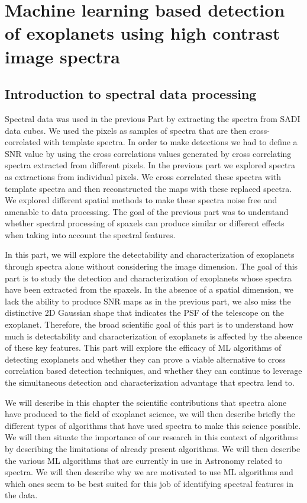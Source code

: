 \part{Machine learning based detection of exoplanets using high contrast image spectra}

\vfill
\startcontents[chapters]
\printmyminitoc{}
\chapter{Introduction to spectral data processing}\label{chap: III.1}
Spectral data was used in the previous Part by extracting the spectra from SADI data cubes.
We used the pixels as samples of spectra that are then cross-correlated with template spectra.
In order to make detections we had to define a SNR value by using the cross correlations values generated by cross correlating spectra extracted from different pixels.
In the previous part we explored spectra as extractions from individual pixels.
We cross correlated these spectra with template spectra and then reconstructed the maps with these replaced spectra.
We explored different spatial methods to make these spectra noise free and amenable to data processing.
The goal of the previous part was to understand whether spectral processing of spaxels can produce similar or different effects when taking into account the spectral features.

In this part, we will explore the detectability and characterization of exoplanets through spectra alone without considering the image dimension. 
The goal of this part is to study the detection and characterization of exoplanets whose spectra have been extracted from the spaxels.
In the absence of a spatial dimension, we lack the ability to produce SNR maps as in the previous part, we also miss the distinctive 2D Gaussian shape that indicates the PSF of the telescope on the exoplanet.
Therefore, the broad scientific goal of this part is to understand how much is detectability and characterization of exoplanets is affected by the absence of these key features.
This part will explore the efficacy of ML algorithms of detecting exoplanets and whether they can prove a viable alternative to cross correlation based detection techniques, and whether they can continue to leverage the simultaneous detection and characterization advantage that spectra lend to.

We will describe in this chapter the scientific contributions that spectra alone have produced to the field of exoplanet science, we will then describe briefly the different types of algorithms that have used spectra to make this science possible. 
We will then situate the importance of our research in this context of algorithms by describing the limitations of already present algorithms. 
We will then describe the various ML algorithms that are currently in use in Astronomy related to spectra.
We will then describe why we are motivated to use ML algorithms and which ones seem to be best suited for this job of identifying spectral features in the data.
